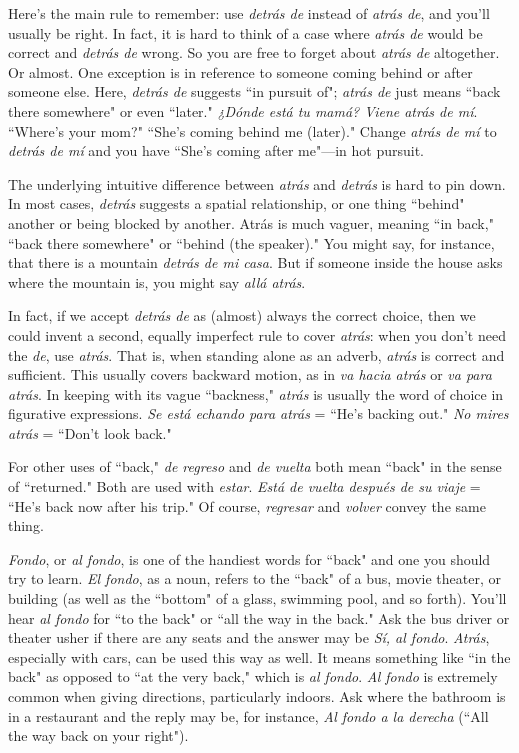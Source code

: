 Here's the main rule to remember: use \emph{detrás de} instead of
\emph{atrás de}, and you'll usually be right. In fact, it is hard to think of a case
where \emph{atrás de} would be correct and \emph{detrás de} wrong. So you are free
to forget about \emph{atrás de} altogether. Or almost. One exception is in reference to someone coming behind or after someone else. Here, \emph{detrás
	de} suggests ``in pursuit of"; \emph{atrás de} just means ``back there somewhere" or even ``later." \emph{¿Dónde está tu mamá? Viene atrás de mí}.
``Where's your mom?" ``She's coming behind me (later)." Change \emph{atrás
	de mí} to \emph{detrás de mí} and you have ``She's coming after me"---in
hot pursuit.

The underlying intuitive difference between \emph{atrás} and \emph{detrás}
is hard to pin down. In most cases, \emph{detrás} suggests a spatial relationship, or one thing ``behind" another or being blocked by another. Atrás
is much vaguer, meaning ``in back," ``back there somewhere" or ``behind (the speaker)." You might say, for instance, that there is a mountain \emph{detrás de mi casa}. But if someone inside the house asks where the
mountain is, you might say \emph{allá atrás}.

In fact, if we accept \emph{detrás de} as (almost) always the correct
choice, then we could invent a second, equally imperfect rule to cover
\emph{atrás}: when you don't need the \emph{de}, use \emph{atrás}. That is, when standing
alone as an adverb, \emph{atrás} is correct and sufficient. This usually covers
backward motion, as in \emph{va hacia atrás} or \emph{va para atrás}. In keeping
with its vague ``backness," \emph{atrás} is usually the word of choice in figurative expressions. \emph{Se está echando para atrás} = ``He's backing out."
\emph{No mires atrás} = ``Don't look back."

For other uses of ``back," \emph{de regreso} and \emph{de vuelta} both mean
``back" in the sense of ``returned." Both are used with \emph{estar}. \emph{Está de
	vuelta después de su viaje} = ``He's back now after his trip." Of course,
\emph{regresar} and \emph{volver} convey the same thing.

\emph{Fondo}, or \emph{al fondo}, is one of the handiest words for ``back"
and one you should try to learn. \emph{El fondo}, as a noun, refers to the
``back" of a bus, movie theater, or building (as well as the ``bottom"
of a glass, swimming pool, and so forth). You'll hear \emph{al fondo} for ``to
the back" or ``all the way in the back." Ask the bus driver or theater
usher if there are any seats and the answer may be \emph{Sí, al fondo}. \emph{Atrás},
especially with cars, can be used this way as well. It means something
like ``in the back" as opposed to ``at the very back," which is \emph{al fondo}.
\emph{Al fondo} is extremely common when giving directions, particularly
indoors. Ask where the bathroom is in a restaurant and the reply may
be, for instance, \emph{Al fondo a la derecha} (``All the way back on your
right").

